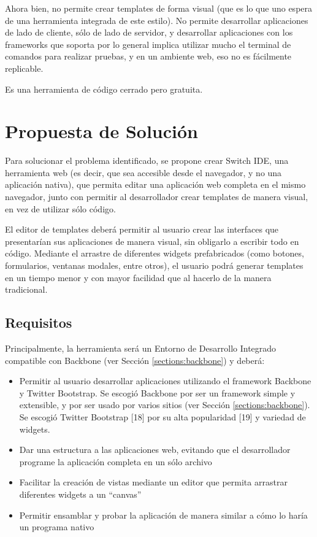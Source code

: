\documentclass[12pt,spanish,letter]{report}
\begin{document}
Ahora bien, no permite crear templates de forma visual (que es lo que
uno espera de una herramienta integrada de este estilo). No permite
desarrollar aplicaciones de lado de cliente, sólo de lado de servidor, y
desarrollar aplicaciones con los frameworks que soporta por lo general
implica utilizar mucho el terminal de comandos para realizar pruebas, y
en un ambiente web, eso no es fácilmente replicable.

Es una herramienta de código cerrado pero gratuita.

\clearpage
\newpage

\chapter{Propuesta de Solución}

\label{section:solution-proposal}

Para solucionar el problema identificado, se propone crear Switch IDE,
una herramienta web (es decir, que sea accesible desde el navegador, y
no una aplicación nativa), que permita editar una aplicación web
completa en el mismo navegador, junto con permitir al desarrollador
crear templates de manera visual, en vez de utilizar sólo código.

El editor de templates deberá permitir al usuario crear las interfaces
que presentarían sus aplicaciones de manera visual, sin obligarlo a
escribir todo en código. Mediante el arrastre de diferentes widgets
prefabricados (como botones, formularios, ventanas modales, entre
otros), el usuario podrá generar templates en un tiempo menor y con
mayor facilidad que al hacerlo de la manera tradicional.

\section{Requisitos}

Principalmente, la herramienta será un Entorno de Desarrollo Integrado
compatible con Backbone (ver Sección \ref{sections:backbone}) y deberá:

\begin{itemize}
\item
  Permitir al usuario desarrollar aplicaciones utilizando el framework
  Backbone y Twitter Bootstrap. Se escogió Backbone por ser un framework
  simple y extensible, y por ser usado por varios sitios (ver Sección
  \ref{sections:backbone}). Se escogió Twitter Bootstrap {[}18{]} por su
  alta popularidad {[}19{]} y variedad de widgets.
\item
  Dar una estructura a las aplicaciones web, evitando que el
  desarrollador programe la aplicación completa en un sólo archivo
\item
  Facilitar la creación de vistas mediante un editor que permita
  arrastrar diferentes widgets a un ``canvas''
\item
  Permitir ensamblar y probar la aplicación de manera similar a cómo lo
  haría un programa nativo
\end{itemize}
\end{document}

